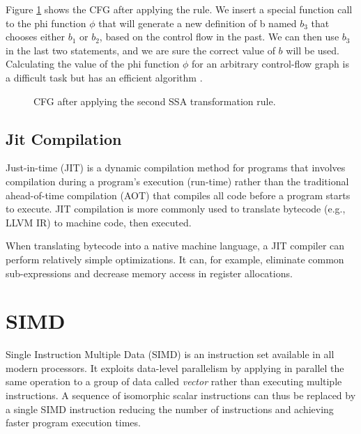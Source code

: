 Figure \ref{fig:cfg3} shows the CFG after applying the rule. We insert a special function call to the phi function $\phi$ that will generate a new definition of b named $b_3$ that chooses either $b_1$ or $b_2$, based on the control flow in the past. We can then use $b_3$ in the last two statements, and we are sure the correct value of $b$ will be used.
Calculating the value of the phi function $\phi$ for an arbitrary control-flow graph is a difficult task but has an efficient algorithm \cite{domalgo}.

\begin{figure}[htbp]
\centering
\usetikzlibrary{shapes,calc}
\caption{CFG after applying the second SSA transformation rule.}\label{fig:cfg3}
\end{figure}

\subsection{Jit Compilation}
Just-in-time (JIT) is a dynamic compilation method for programs that involves compilation during a program's execution (run-time) rather than the traditional ahead-of-time compilation (AOT) that compiles all code before a program starts to execute. JIT compilation is more commonly used to translate bytecode (e.g., LLVM IR) to machine code, then executed.

When translating bytecode into a native machine language, a JIT compiler can perform relatively simple optimizations. It can, for example, eliminate common sub-expressions and decrease memory access in register allocations.

\section{SIMD}
Single Instruction Multiple Data (SIMD) is an instruction set available in all modern processors. It exploits data-level parallelism by applying in parallel the same operation to a group of data called \textit{vector} rather than executing multiple instructions. A sequence of isomorphic scalar instructions can thus be replaced by a single SIMD instruction reducing the number of instructions and achieving faster program execution times.

